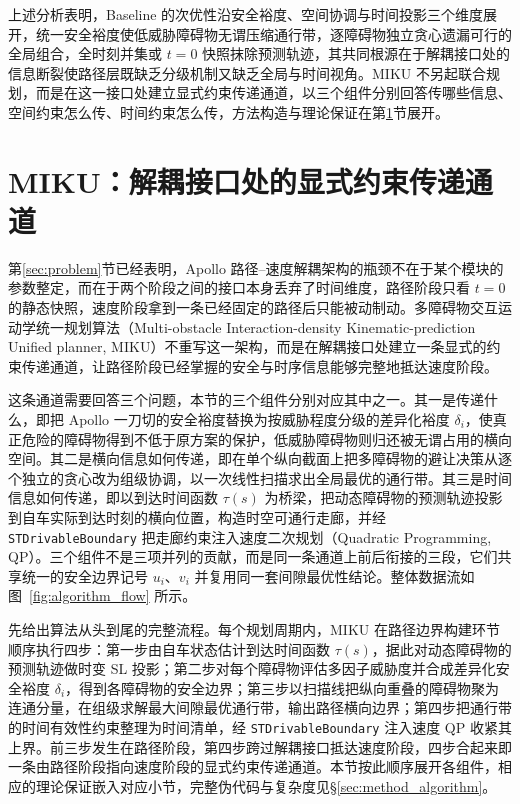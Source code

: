 \documentclass[a4paper,zihao=5]{ctexart}
\theoremstyle{definition}
\begin{document}
上述分析表明，Baseline 的次优性沿安全裕度、空间协调与时间投影三个维度展开，统一安全裕度使低威胁障碍物无谓压缩通行带，逐障碍物独立贪心遗漏可行的全局组合，全时刻并集或 $t{=}0$ 快照抹除预测轨迹，其共同根源在于解耦接口处的信息断裂使路径层既缺乏分级机制又缺乏全局与时间视角。MIKU 不另起联合规划，而是在这一接口处建立显式约束传递通道，以三个组件分别回答传哪些信息、空间约束怎么传、时间约束怎么传，方法构造与理论保证在第\ref{sec:method}节展开。

\section{MIKU：解耦接口处的显式约束传递通道}
\label{sec:method}

第\ref{sec:problem}节已经表明，Apollo 路径--速度解耦架构的瓶颈不在于某个模块的参数整定，而在于两个阶段之间的接口本身丢弃了时间维度，路径阶段只看 $t=0$ 的静态快照，速度阶段拿到一条已经固定的路径后只能被动制动。多障碍物交互运动学统一规划算法（Multi-obstacle Interaction-density Kinematic-prediction Unified planner, MIKU）不重写这一架构，而是在解耦接口处建立一条显式的约束传递通道，让路径阶段已经掌握的安全与时序信息能够完整地抵达速度阶段。

这条通道需要回答三个问题，本节的三个组件分别对应其中之一。其一是传递什么，即把 Apollo 一刀切的安全裕度替换为按威胁程度分级的差异化裕度 $\delta_i$，使真正危险的障碍物得到不低于原方案的保护，低威胁障碍物则归还被无谓占用的横向空间。其二是横向信息如何传递，即在单个纵向截面上把多障碍物的避让决策从逐个独立的贪心改为组级协调，以一次线性扫描求出全局最优的通行带。其三是时间信息如何传递，即以到达时间函数 $\tau(s)$ 为桥梁，把动态障碍物的预测轨迹投影到自车实际到达时刻的横向位置，构造时空可通行走廊，并经 \texttt{STDrivableBoundary} 把走廊约束注入速度二次规划（Quadratic Programming, QP）。三个组件不是三项并列的贡献，而是同一条通道上前后衔接的三段，它们共享统一的安全边界记号 $u_i$、$v_i$ 并复用同一套间隙最优性结论。整体数据流如图~\ref{fig:algorithm_flow} 所示。

先给出算法从头到尾的完整流程。每个规划周期内，MIKU 在路径边界构建环节顺序执行四步：第一步由自车状态估计到达时间函数 $\tau(s)$，据此对动态障碍物的预测轨迹做时变 SL 投影；第二步对每个障碍物评估多因子威胁度并合成差异化安全裕度 $\delta_i$，得到各障碍物的安全边界；第三步以扫描线把纵向重叠的障碍物聚为连通分量，在组级求解最大间隙最优通行带，输出路径横向边界；第四步把通行带的时间有效性约束整理为时间清单，经 \texttt{STDrivableBoundary} 注入速度 QP 收紧其上界。前三步发生在路径阶段，第四步跨过解耦接口抵达速度阶段，四步合起来即一条由路径阶段指向速度阶段的显式约束传递通道。本节按此顺序展开各组件，相应的理论保证嵌入对应小节，完整伪代码与复杂度见§\ref{sec:method_algorithm}。
\end{document}
